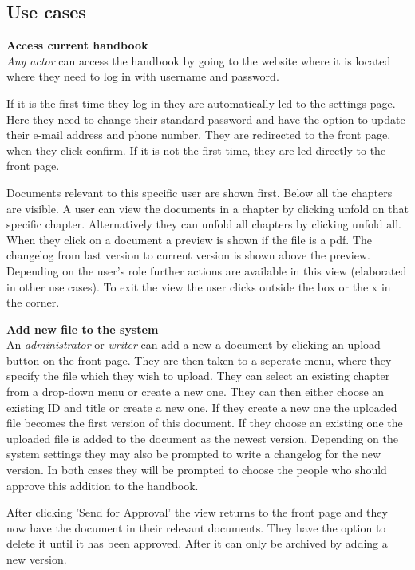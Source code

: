 \subsection{Use cases} \label{sec:usecases}

\textbf{Access current handbook}
\\
\textit{Any actor} can access the handbook by going to the website where it is located where they need to log in with username and password.

If it is the first time they log in they are automatically led to the settings page.
Here they need to change their standard password and have the option to update their e-mail address and phone number.
They are redirected to the front page, when they click confirm.
If it is not the first time, they are led directly to the front page.

Documents relevant to this specific user are shown first.
Below all the chapters are visible.
A user can view the documents in a chapter by clicking unfold on that specific chapter.
Alternatively they can unfold all chapters by clicking unfold all.
When they click on a document a preview is shown if the file is a pdf.
The changelog from last version to current version is shown above the preview.
Depending on the user's role further actions are available in this view (elaborated in other use cases).
To exit the view the user clicks outside the box or the x in the corner.


\textbf{Add new file to the system}
\\
An \textit{administrator} or \textit{writer} can add a new a document by clicking an upload button on the front page.
They are then taken to a seperate menu, where they specify the file which they wish to upload.
They can select an existing chapter from a drop-down menu or create a new one. 
They can then either choose an existing ID and title or create a new one.
If they create a new one the uploaded file becomes the first version of this document.
If they choose an existing one the uploaded file is added to the document as the newest version.
Depending on the system settings they may also be prompted to write a changelog for the new version.
In both cases they will be prompted to choose the people who should approve this addition to the handbook.

After clicking 'Send for Approval' the view returns to the front page and they now have the document in their relevant documents.
They have the option to delete it until it has been approved.
After it can only be archived by adding a new version.

